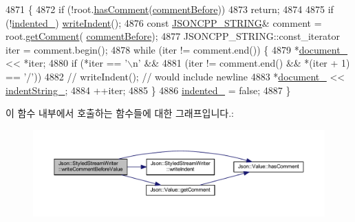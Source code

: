 \begin{DoxyCode}
4871                                                                   \{
4872   \textcolor{keywordflow}{if} (!root.\hyperlink{class_json_1_1_value_a65d8e3ab6a5871cbd019a3e0f0b944a3}{hasComment}(\hyperlink{namespace_json_a4fc417c23905b2ae9e2c47d197a45351a52f1733775460517b2ea6bedf4906d52}{commentBefore}))
4873     \textcolor{keywordflow}{return};
4874 
4875   \textcolor{keywordflow}{if} (!\hyperlink{class_json_1_1_styled_stream_writer_aa12db1753619a9b48da41f3e45e3275d}{indented\_}) \hyperlink{class_json_1_1_styled_stream_writer_a5a52fa5b406f1580a61dde3b5638e76d}{writeIndent}();
4876   \textcolor{keyword}{const} \hyperlink{json-forwards_8h_a1e723f95759de062585bc4a8fd3fa4be}{JSONCPP\_STRING}& comment = root.\hyperlink{class_json_1_1_value_a82817229a986f0b254e31d5c83066ffe}{getComment}(
      \hyperlink{namespace_json_a4fc417c23905b2ae9e2c47d197a45351a52f1733775460517b2ea6bedf4906d52}{commentBefore});
4877   JSONCPP\_STRING::const\_iterator iter = comment.begin();
4878   \textcolor{keywordflow}{while} (iter != comment.end()) \{
4879     *\hyperlink{class_json_1_1_styled_stream_writer_aa8c4e4576f5c3dcb10955d133a092dd6}{document\_} << *iter;
4880     \textcolor{keywordflow}{if} (*iter == \textcolor{charliteral}{'\(\backslash\)n'} &&
4881        (iter != comment.end() && *(iter + 1) == \textcolor{charliteral}{'/'}))
4882       \textcolor{comment}{// writeIndent();  // would include newline}
4883       *\hyperlink{class_json_1_1_styled_stream_writer_aa8c4e4576f5c3dcb10955d133a092dd6}{document\_} << \hyperlink{class_json_1_1_styled_stream_writer_a1481433ebe1491ea83b0beb92aed56c2}{indentString\_};
4884     ++iter;
4885   \}
4886   \hyperlink{class_json_1_1_styled_stream_writer_aa12db1753619a9b48da41f3e45e3275d}{indented\_} = \textcolor{keyword}{false};
4887 \}
\end{DoxyCode}
이 함수 내부에서 호출하는 함수들에 대한 그래프입니다.\+:\nopagebreak
\begin{figure}[H]
\begin{center}
\leavevmode
\includegraphics[width=350pt]{class_json_1_1_styled_stream_writer_a79c3c2b320475035c47b2db484a3e434_cgraph}
\end{center}
\end{figure}
